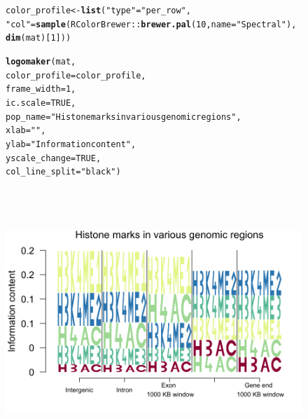 \documentclass[12pt]{article}\usepackage[]{graphicx}\usepackage[usenames,dvipsnames]{color}
\makeatletter
\newcommand{\hlnum}[1]{\textcolor[rgb]{0.686,0.059,0.569}{#1}}%
\newcommand{\hlstr}[1]{\textcolor[rgb]{0.192,0.494,0.8}{#1}}%
\newcommand{\hlopt}[1]{\textcolor[rgb]{0,0,0}{#1}}%
\newcommand{\hlstd}[1]{\textcolor[rgb]{0.345,0.345,0.345}{#1}}%
\newcommand{\hlkwb}[1]{\textcolor[rgb]{0.69,0.353,0.396}{#1}}%
\newcommand{\hlkwc}[1]{\textcolor[rgb]{0.333,0.667,0.333}{#1}}%
\newcommand{\hlkwd}[1]{\textcolor[rgb]{0.737,0.353,0.396}{\textbf{#1}}}%
\newenvironment{kframe}{%
 \def\at@end@of@kframe{}%
 \ifinner\ifhmode%
  \def\at@end@of@kframe{\end{minipage}}%
  \begin{minipage}{\columnwidth}%
 \fi\fi%
 \def\FrameCommand##1{\hskip\@totalleftmargin \hskip-\fboxsep
 \colorbox{shadecolor}{##1}\hskip-\fboxsep
     \hskip-\linewidth \hskip-\@totalleftmargin \hskip\columnwidth}%
 \MakeFramed {\advance\hsize-\width
   \@totalleftmargin\z@ \linewidth\hsize
   \@setminipage}}%
 {\par\unskip\endMakeFramed%
 \at@end@of@kframe}
\newenvironment{knitrout}{}{} %
\makeatother
\begin{document}
\begin{figure}[h]
\begin{center}
\begin{knitrout}
\color{fgcolor}\begin{kframe}
\begin{alltt}
\hlstd{color_profile} \hlkwb{<-} \hlkwd{list}\hlstd{(}\hlstr{"type"} \hlstd{=} \hlstr{"per_row"}\hlstd{,}
                      \hlstr{"col"} \hlstd{=} \hlkwd{sample}\hlstd{(RColorBrewer}\hlopt{::}\hlkwd{brewer.pal}\hlstd{(}\hlnum{10}\hlstd{,}\hlkwc{name} \hlstd{=} \hlstr{"Spectral"}\hlstd{),}
                          \hlkwd{dim}\hlstd{(mat)[}\hlnum{1}\hlstd{]))}


\hlkwd{logomaker}\hlstd{(mat,}
          \hlkwc{color_profile} \hlstd{= color_profile,}
          \hlkwc{frame_width} \hlstd{=} \hlnum{1}\hlstd{,}
          \hlkwc{ic.scale} \hlstd{=} \hlnum{TRUE}\hlstd{,}
          \hlkwc{pop_name} \hlstd{=} \hlstr{"Histone marks in various genomic regions"}\hlstd{,}
          \hlkwc{xlab} \hlstd{=} \hlstr{""}\hlstd{,}
          \hlkwc{ylab} \hlstd{=} \hlstr{"Information content"}\hlstd{,}
          \hlkwc{yscale_change} \hlstd{=} \hlnum{TRUE}\hlstd{,}
          \hlkwc{col_line_split} \hlstd{=} \hlstr{"black"}\hlstd{)}
\end{alltt}
\end{kframe}
\includegraphics[width=6.5in,height=4in]{figure/logolas_use_9-1} 

\end{knitrout}
\end{center}
\end{figure}
\end{document}
